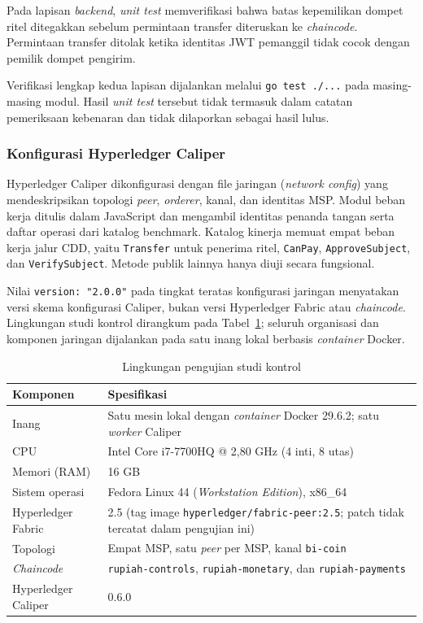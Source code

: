 Pada lapisan \textit{backend}, \textit{unit test} memverifikasi bahwa batas
kepemilikan dompet ritel ditegakkan sebelum permintaan transfer diteruskan ke
\textit{chaincode}. Permintaan transfer ditolak ketika identitas JWT pemanggil
tidak cocok dengan pemilik dompet pengirim.

Verifikasi lengkap kedua lapisan dijalankan melalui \texttt{go test ./...}
pada masing-masing modul. Hasil \textit{unit test} tersebut tidak termasuk dalam catatan pemeriksaan kebenaran dan tidak dilaporkan sebagai hasil lulus.

\subsubsection{Konfigurasi Hyperledger Caliper}

Hyperledger Caliper dikonfigurasi dengan file jaringan (\textit{network config})
yang mendeskripsikan topologi \textit{peer}, \textit{orderer}, kanal, dan
identitas MSP. Modul beban kerja ditulis dalam JavaScript dan mengambil
identitas penanda tangan serta daftar operasi dari katalog benchmark. Katalog
kinerja memuat empat beban kerja jalur CDD, yaitu \texttt{Transfer} untuk
penerima ritel, \texttt{CanPay}, \texttt{ApproveSubject}, dan
\texttt{VerifySubject}. Metode publik lainnya hanya diuji secara fungsional.

Nilai \texttt{version: "2.0.0"} pada tingkat teratas konfigurasi jaringan
menyatakan versi skema konfigurasi Caliper, bukan versi Hyperledger Fabric atau
\textit{chaincode}. Lingkungan studi kontrol dirangkum pada
Tabel~\ref{tab:lingkungan-uji}; seluruh organisasi dan komponen jaringan
dijalankan pada satu inang lokal berbasis \textit{container} Docker.

\begin{table}[H]
\centering
\caption{Lingkungan pengujian studi kontrol}
\label{tab:lingkungan-uji}
\begin{tabular}{lp{8.5cm}}
\hline
\textbf{Komponen} & \textbf{Spesifikasi} \\
\hline
Inang & Satu mesin lokal dengan \textit{container} Docker 29.6.2; satu \textit{worker} Caliper \\
CPU & Intel Core i7-7700HQ @ 2,80 GHz (4 inti, 8 utas) \\
Memori (RAM) & 16 GB \\
Sistem operasi & Fedora Linux 44 (\textit{Workstation Edition}), x86\_64 \\
Hyperledger Fabric & 2.5 (tag image \texttt{hyperledger/\allowbreak{}fabric-peer:\allowbreak{}2.5}; patch tidak tercatat dalam pengujian ini) \\
Topologi & Empat MSP, satu \textit{peer} per MSP, kanal \texttt{bi-coin} \\
\textit{Chaincode} & \texttt{rupiah-controls}, \texttt{rupiah-monetary}, dan \texttt{rupiah-payments} \\
Hyperledger Caliper & 0.6.0 \\
\hline
\end{tabular}
\end{table}

